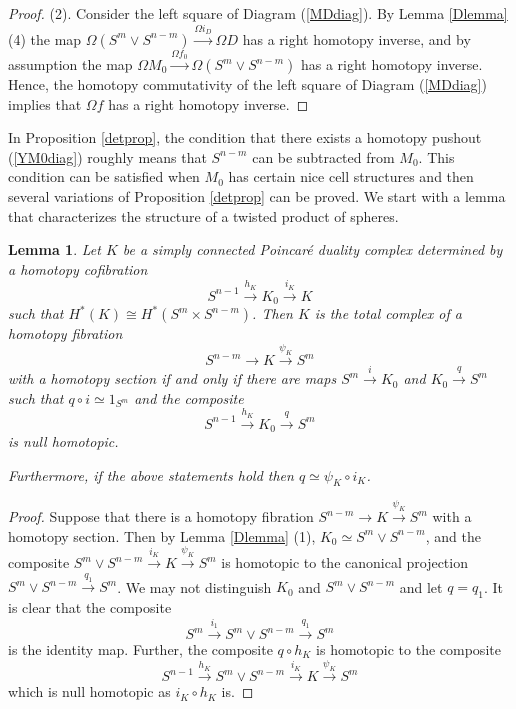 \documentclass[a4]{amsart}
\newtheorem{lemma}[theorem]{Lemma}
\theoremstyle{definition}
\begin{document}
\begin{sloppypar}
\begin{proof}
(2). Consider the left square of Diagram (\ref{MDdiag}). By Lemma \ref{Dlemma} (4) the map $\Omega (S^m\vee S^{n-m})\stackrel{\Omega i_D}{\longrightarrow} \Omega D$ has a right homotopy inverse, and by assumption the map $\Omega M_0\stackrel{\Omega f_0}{\longrightarrow} \Omega (S^m\vee S^{n-m})$ has a right homotopy inverse. Hence, the homotopy commutativity of the left square of Diagram (\ref{MDdiag}) implies that $\Omega f$ has a right homotopy inverse. 
\end{proof}



In Proposition \ref{detprop}, the condition that there exists a homotopy pushout (\ref{YM0diag}) roughly means that $S^{n-m}$ can be subtracted from $M_0$. This condition can be satisfied when $M_0$ has certain nice cell structures and then several variations of Proposition \ref{detprop} can be proved. We start with a lemma that characterizes the structure of a twisted product of spheres.  

\begin{lemma}\label{Klemma}
Let $K$ be a simply connected Poincar\'{e} duality complex determined by a homotopy cofibration
\[
S^{n-1}\stackrel{h_K}{\longrightarrow} K_0\stackrel{i_K}{\longrightarrow} K
\]
such that $H^\ast(K)\cong H^\ast(S^m\times S^{n-m})$. 
Then $K$ is the total complex of a homotopy fibration 
\[
S^{n-m}\stackrel{}{\longrightarrow} K\stackrel{\psi_K}{\longrightarrow} S^m
\]
with a homotopy section if and only if there are maps $S^m\stackrel{i}{\longrightarrow} K_0$ and $K_0\stackrel{q}{\longrightarrow} S^m$ such that $q\circ i\simeq 1_{S^m}$ and the composite  
\[
S^{n-1}\stackrel{h_K}{\longrightarrow} K_0\stackrel{q}{\longrightarrow} S^m
\] 
is null homotopic. 

Furthermore, if the above statements hold then $q\simeq \psi_K\circ i_K$. 
\end{lemma}
\begin{proof}
Suppose that there is a homotopy fibration 
$
S^{n-m}\stackrel{}{\longrightarrow} K\stackrel{\psi_K}{\longrightarrow} S^m
$
with a homotopy section. Then by Lemma \ref{Dlemma} (1), $K_0\simeq S^m\vee S^{n-m}$, and the composite $S^m\vee S^{n-m}\stackrel{i_K}{\longrightarrow} K\stackrel{\psi_K}{\longrightarrow} S^m$ is homotopic to the canonical projection $S^m\vee S^{n-m}\stackrel{q_1}{\longrightarrow} S^m$. 
We may not distinguish $K_0 $ and $S^m\vee S^{n-m}$ and let $q=q_1$. It is clear that the composite 
\[
S^m\stackrel{i_1}{\longrightarrow} S^m\vee S^{n-m} \stackrel{q_1}{\longrightarrow} S^m
\]
is the identity map.
Further, the composite $q\circ h_K$ is homotopic to the composite
\[
S^{n-1}\stackrel{h_K}{\longrightarrow} S^m\vee S^{n-m}\stackrel{i_K}{\longrightarrow} K\stackrel{\psi_K}{\longrightarrow} S^m
\]
which is null homotopic as $i_K\circ h_K$ is. 


\end{proof}
\end{sloppypar}
\end{document}
